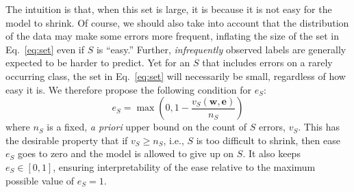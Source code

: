 \documentclass{article} %
\begin{document}
The intuition is that, when this set is large, it is because it is not easy for the
model to shrink.  Of course, we should also take into account 
that the distribution of the data may make some errors more frequent,
inflating the size of the set in Eq.~\ref{eq:set} even if $S$ is ``easy.''
Further,  \emph{infrequently} observed labels are generally
expected to be harder to predict.  Yet for an $S$ that includes errors on
a  rarely occurring class, the set in Eq.~\ref{eq:set} will
necessarily be small, regardless of how easy it is.
We therefore propose the following condition for $e_S$:
\begin{equation}
e_S = \max\left( 0, 1 - \frac{v_S(\mathbf{w}, \mathbf{e}) }{n_S}\right) \label{e-condition}
\end{equation}
where $n_S$ is a fixed, \emph{a priori} upper bound on the count of
$S$ errors, $v_S$.   This
has the desirable property that  if $v_S \ge n_S$,  i.e., $S$ is too
difficult to shrink, then ease $e_S$ goes to zero and the model is
allowed to give up on $S$.  It also keeps $e_S \in [0,1]$, 
ensuring interpretability of the ease relative to the
maximum possible value of $e_S=1$.

\end{document}
